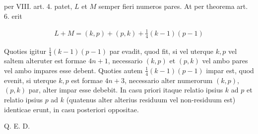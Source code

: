 per VIII. art. 4. patet, $L$ et $M$ semper fieri numeros pares.  At per theorema art. 6. erit

\[
\begin{aligned}
L+M=(k,p)+(p,k)+\tfrac14(k-1)(p-1)
\end{aligned}
\]

Quoties igitur $\frac14(k-1)(p-1)$ par evadit, quod fit, si vel uterque $k,p$ vel saltem alteruter est formae $4n+1$, necessario $(k,p)$ et $(p,k)$ vel ambo pares vel ambo impares esse debent.  Quoties autem $\frac14(k-1)(p-1)$ impar est, quod evenit, si uterque $k,p$ est formae $4n+3$, necessario alter numerorum $(k,p)$, $(p,k)$ par, alter impar esse debebit.  In casu priori itaque relatio ipsius $k$ ad $p$ et relatio ipsius $p$ ad $k$ (quatenus alter alterius residuum vel non-residuum est) identicae erunt, in casu posteriori oppositae.

Q. E. D.

\BookRule{35mm}

